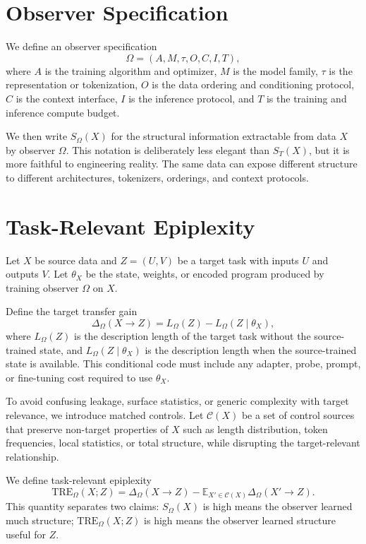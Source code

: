 \documentclass[11pt]{article}
\begin{document}
\section{Observer Specification}

We define an observer specification
\begin{equation}
  \Omega = (A, M, \tau, O, C, I, T),
\end{equation}
where $A$ is the training algorithm and optimizer, $M$ is the model family, $\tau$ is the representation or tokenization, $O$ is the data ordering and conditioning protocol, $C$ is the context interface, $I$ is the inference protocol, and $T$ is the training and inference compute budget.

We then write $S_\Omega(X)$ for the structural information extractable from data $X$ by observer $\Omega$. This notation is deliberately less elegant than $S_T(X)$, but it is more faithful to engineering reality. The same data can expose different structure to different architectures, tokenizers, orderings, and context protocols.

\section{Task-Relevant Epiplexity}

Let $X$ be source data and $Z=(U,V)$ be a target task with inputs $U$ and outputs $V$. Let $\theta_X$ be the state, weights, or encoded program produced by training observer $\Omega$ on $X$.

Define the target transfer gain
\begin{equation}
  \Delta_\Omega(X \rightarrow Z)
  = L_\Omega(Z) - L_\Omega(Z \mid \theta_X),
\end{equation}
where $L_\Omega(Z)$ is the description length of the target task without the source-trained state, and $L_\Omega(Z \mid \theta_X)$ is the description length when the source-trained state is available. This conditional code must include any adapter, probe, prompt, or fine-tuning cost required to use $\theta_X$.

To avoid confusing leakage, surface statistics, or generic complexity with target relevance, we introduce matched controls. Let $\mathcal{C}(X)$ be a set of control sources that preserve non-target properties of $X$ such as length distribution, token frequencies, local statistics, or total structure, while disrupting the target-relevant relationship.

We define task-relevant epiplexity
\begin{equation}
  \mathrm{TRE}_\Omega(X;Z)
  =
  \Delta_\Omega(X \rightarrow Z)
  -
  \mathbb{E}_{X' \in \mathcal{C}(X)}
  \Delta_\Omega(X' \rightarrow Z).
\end{equation}
This quantity separates two claims: $S_\Omega(X)$ is high means the observer learned much structure; $\mathrm{TRE}_\Omega(X;Z)$ is high means the observer learned structure useful for $Z$.
\end{document}
